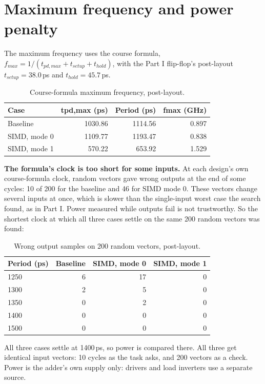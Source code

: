 \documentclass[11pt,a4paper]{article}
\begin{document}
\section{Maximum frequency and power penalty}

The maximum frequency uses the course formula, $f_{max} = 1 / (t_{pd,max} + t_{setup} + t_{hold})$, with the Part I flip-flop's post-layout $t_{setup} = 38.0$\,ps and $t_{hold} = 45.7$\,ps.

\begin{table}[H]\centering\small
\caption{Course-formula maximum frequency, post-layout.}
\begin{tabular}{lrrr}
\toprule
\textbf{Case} & \textbf{tpd,max (ps)} & \textbf{Period (ps)} & \textbf{fmax (GHz)} \\
\midrule
Baseline & 1030.86 & 1114.56 & 0.897 \\
SIMD, mode 0 & 1109.77 & 1193.47 & 0.838 \\
SIMD, mode 1 & 570.22 & 653.92 & 1.529 \\
\bottomrule
\end{tabular}
\end{table}

\textbf{The formula's clock is too short for some inputs.} At each design's own course-formula clock, random vectors gave wrong outputs at the end of some cycles: 10 of 200 for the baseline and 46 for SIMD mode 0. These vectors change several inputs at once, which is slower than the single-input worst case the search found, as in Part I. Power measured while outputs fail is not trustworthy. So the shortest clock at which all three cases settle on the same 200 random vectors was found:

\begin{table}[H]\centering\small
\caption{Wrong output samples on 200 random vectors, post-layout.}
\begin{tabular}{lrrr}
\toprule
\textbf{Period (ps)} & \textbf{Baseline} & \textbf{SIMD, mode 0} & \textbf{SIMD, mode 1} \\
\midrule
1250 & 6 & 17 & 0 \\
1300 & 2 & 5 & 0 \\
1350 & 0 & 2 & 0 \\
1400 & 0 & 0 & 0 \\
1500 & 0 & 0 & 0 \\
\bottomrule
\end{tabular}
\end{table}

All three cases settle at 1400\,ps, so power is compared there. All three get identical input vectors: 10 cycles as the task asks, and 200 vectors as a check. Power is the adder's own supply only: drivers and load inverters use a separate source.
\end{document}
